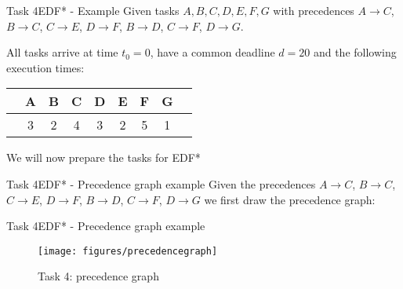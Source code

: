 \begin{frame}[allowframebreaks]{Task 4}{EDF* - Example}
Given tasks $A, B, C, D, E, F, G$ with precedences $A \rightarrow C$, $B \rightarrow C$, $C \rightarrow E$, $D \rightarrow F$, $B \rightarrow D$, $C \rightarrow F$, $D \rightarrow G$.

All tasks arrive at time $t_0 = 0$, have a common deadline $d = 20$ and the following execution times:
\begin{center}
\begin{tabular}{|c|c|c|c|c|c|c|c|c|}
     \hline
     & A & B & C & D & E & F & G\\
     \hline
     \hline
     & 3 & 2 & 4 & 3 & 2 & 5 & 1\\
     \hline
\end{tabular}
\end{center}
We will now prepare the tasks for EDF*
\end{frame}

\begin{frame}{Task 4}{EDF* - Precedence graph example}
Given the precedences $A \rightarrow C$, $B \rightarrow C$, $C \rightarrow E$, $D \rightarrow F$, $B \rightarrow D$, $C \rightarrow F$, $D \rightarrow G$ we first draw the precedence graph:
\end{frame}

\begin{frame}{Task 4}{EDF* - Precedence graph example}
\begin{figure}
    \centering
    \texttt{[image: figures/precedencegraph]}
    \caption{Task 4: precedence graph}
    \label{pregraph}
\end{figure}
\end{frame}

